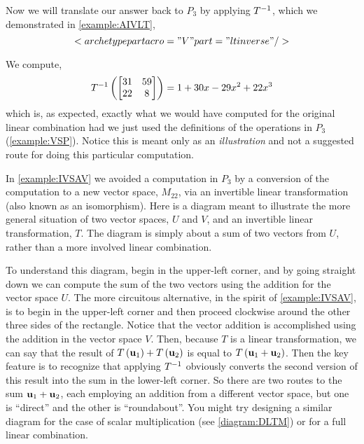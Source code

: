 \documentclass{ximera}
\begin{document}
\begin{example}
Now we will translate our answer back to $P_3$ by applying $T^{-1}$, which we demonstrated in \ref{example:AIVLT},
\[
<archetypepart acro="V" part="ltinverse" />\]




We compute,
\[
T^{-1}\left(
\begin{bmatrix}
31 & 59\\22 & 8
\end{bmatrix}
\right)
=1+30x-29x^2+22x^3
\]
which is, as expected, exactly what we would have computed for the original linear combination had we just used the definitions of the operations in $P_3$ (\ref{example:VSP}).  Notice this is meant only as an \textit{illustration} and not a suggested route for doing this particular computation.



\end{example}

In \ref{example:IVSAV} we avoided a computation in $P_3$ by a conversion of the computation to a new vector space, $M_{22}$, via an invertible linear transformation (also known as an isomorphism).  Here is a diagram meant to illustrate the more general situation of two vector spaces, $U$ and $V$, and an invertible linear transformation, $T$.  The diagram is simply about a sum of two vectors from $U$, rather than a more involved linear combination.
\begin{image}
\end{image}
To understand this diagram, begin in the upper-left corner, and by going straight down we can compute the sum of the two vectors using the addition for the vector space $U$.  The more circuitous alternative, in the spirit of \ref{example:IVSAV}, is to begin in the upper-left corner and then proceed clockwise around the other three sides of the rectangle.  Notice that the vector addition is accomplished using the addition in the vector space $V$.  Then, because $T$ is a linear transformation, we can say that the result of $T\left(\mathbf{u}_1\right)+T\left(\mathbf{u}_2\right)$ is  equal to $T\left(\mathbf{u}_1+\mathbf{u}_2\right)$.  Then the key feature is to recognize that applying $T^{-1}$ obviously converts the second version of this result into the sum in the lower-left corner.  So there are two routes to the sum $\mathbf{u}_1+\mathbf{u}_2$, each employing an addition from a different vector space, but one is ``direct'' and the other is ``roundabout''.  You might try designing a similar diagram for the case of scalar multiplication (see \ref{diagram:DLTM}) or for a full linear combination.
\end{document}
